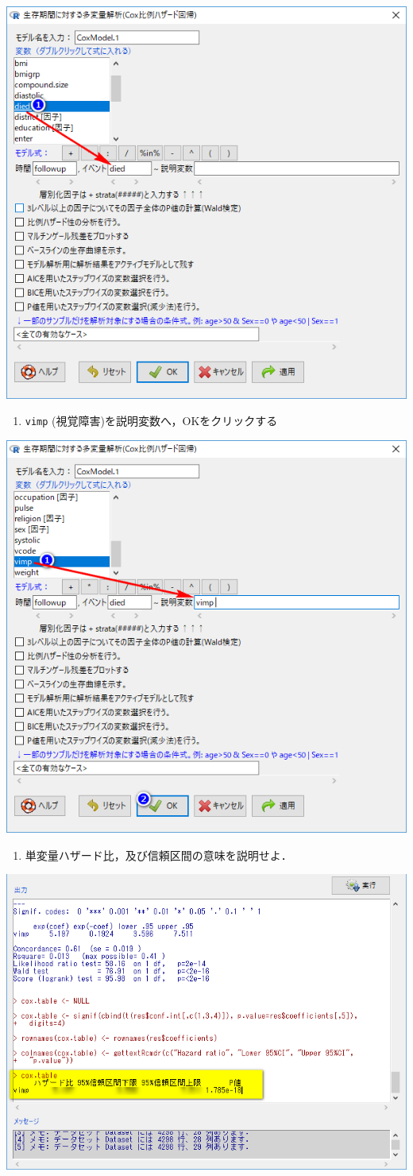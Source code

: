 \documentclass[11pt,]{problemset}
\providecommand{\tightlist}{%
  \setlength{\itemsep}{0pt}\setlength{\parskip}{0pt}}
\begin{document}
\begin{center}\includegraphics[width=0.6\linewidth,height=0.4\textheight]{pic/survival15} \end{center}

\begin{enumerate}
\def\labelenumi{\arabic{enumi}.}
\setcounter{enumi}{3}
\tightlist
\item
  \texttt{vimp} (視覚障害)を説明変数へ，OKをクリックする
\end{enumerate}

\begin{center}\includegraphics[width=0.6\linewidth,height=0.4\textheight]{pic/survival16} \end{center}

\begin{enumerate}
\def\labelenumi{\arabic{enumi}.}
\setcounter{enumi}{4}
\tightlist
\item
  単変量ハザード比，及び信頼区間の意味を説明せよ．
\end{enumerate}

\begin{center}\includegraphics[width=0.6\linewidth,height=0.4\textheight]{pic/survival17cut} \end{center}
\end{document}
